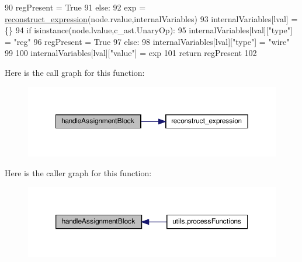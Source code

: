 \begin{DoxyCode}
90         regPresent = \textcolor{keyword}{True}
91     \textcolor{keywordflow}{else}:
92         exp = \hyperlink{namespaceblockHandlers_a5dcb5985c58176982a44686f616daa7f}{reconstruct\_expression}(node.rvalue,internalVariables)
93         internalVariables[lval] = \{\}
94         \textcolor{keywordflow}{if} isinstance(node.lvalue,c\_ast.UnaryOp):
95             internalVariables[lval][\textcolor{stringliteral}{"type"}] = \textcolor{stringliteral}{"reg"}
96             regPresent = \textcolor{keyword}{True}
97         \textcolor{keywordflow}{else}:
98             internalVariables[lval][\textcolor{stringliteral}{"type"}] = \textcolor{stringliteral}{"wire"}
99         
100     internalVariables[lval][\textcolor{stringliteral}{"value"}] = exp
101     \textcolor{keywordflow}{return} regPresent
102 
\end{DoxyCode}
Here is the call graph for this function\+:\nopagebreak
\begin{figure}[H]
\begin{center}
\leavevmode
\includegraphics[width=350pt]{namespaceblockHandlers_ac54cbd08eb8b12eed0c801fa775911dd_cgraph}
\end{center}
\end{figure}
Here is the caller graph for this function\+:\nopagebreak
\begin{figure}[H]
\begin{center}
\leavevmode
\includegraphics[width=350pt]{namespaceblockHandlers_ac54cbd08eb8b12eed0c801fa775911dd_icgraph}
\end{center}
\end{figure}
\mbox{\label{namespaceblockHandlers_ad92852be9f2eee24eb76b2dd747e7584}} 
